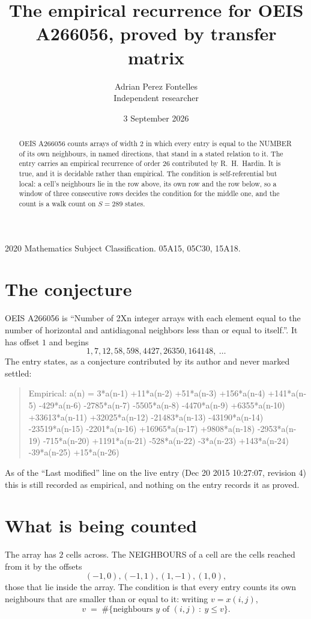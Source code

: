 \documentclass[11pt,a4paper]{article}
\title{The empirical recurrence for OEIS A266056, proved by transfer matrix}
\author{Adrian Perez Fontelles\\ \small Independent researcher}
\date{3 September 2026}
\theoremstyle{plain}
\theoremstyle{definition}
\begin{document}
\maketitle

\begin{abstract}
OEIS A266056 counts arrays of width $2$ in which every entry is equal to the NUMBER of its own
neighbours, in named directions, that stand in a stated relation to it. The entry carries an
empirical recurrence of order $26$ contributed by R.~H.~Hardin. It is true, and it is
decidable rather than empirical. The condition is self-referential but local: a cell's
neighbours lie in the row above, its own row and the row below, so a window of three
consecutive rows decides the condition for the middle one, and the count is a walk count on
$S=289$ states.
\end{abstract}

\noindent\small 2020 Mathematics Subject Classification. 05A15, 05C30, 15A18.\normalsize

\section{The conjecture}

OEIS A266056 is ``Number of 2Xn integer arrays with each element equal to the number of horizontal and antidiagonal neighbors less than or equal to itself.''. It has offset $1$ and begins
\[
1, 7, 12, 58, 598, 4427, 26350, 164148,\ \dots
\]
The entry states, as a conjecture contributed by its author and never marked settled:
\begin{quote}
Empirical: a(n) = 3*a(n-1) +11*a(n-2) +51*a(n-3) +156*a(n-4) +141*a(n-5) -429*a(n-6) -2785*a(n-7) -5505*a(n-8) -4470*a(n-9) +6355*a(n-10) +33613*a(n-11) +32025*a(n-12) -21483*a(n-13) -43190*a(n-14) -23519*a(n-15) -2201*a(n-16) +16965*a(n-17) +9808*a(n-18) -2953*a(n-19) -715*a(n-20) +1191*a(n-21) -528*a(n-22) -3*a(n-23) +143*a(n-24) -39*a(n-25) +15*a(n-26)
\end{quote}
As of the ``Last modified'' line on the live entry (Dec 20 2015 10:27:07, revision 4) this is still
recorded as empirical, and nothing on the entry records it as proved.

\section{What is being counted}

The array has $2$ cells across. The NEIGHBOURS of a cell are the cells reached from it by the
offsets
\[
(-1,0), (-1,1), (1,-1), (1,0),
\]
those that lie inside the array. The condition is that every entry counts its own neighbours
that are smaller than or equal to it: writing $v=x(i,j)$,
\[
v\;=\;\#\{\text{neighbours } y \text{ of } (i,j)\ :\ y\le v\} .
\]
\end{document}
